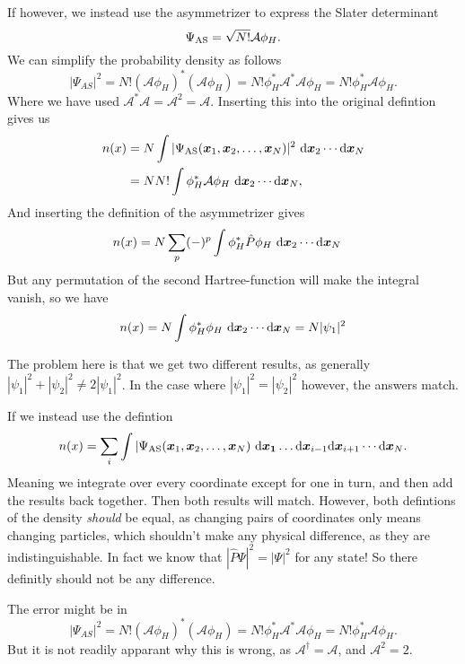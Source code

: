 \documentclass[a4paper, 11pt, notitlepage, english]{article}
\newcommand{\op}[1]{\hat{#1}}
\renewcommand{\d}{{\rm d}}
\newcommand{\bt}[1]{\boldsymbol{#1}}
\begin{document}
If however, we instead use the asymmetrizer to express the Slater determinant
$$\Psi_{\rm AS} = \sqrt{N!}\mathcal{A}\phi_H.$$
We can simplify the probability density as follows
$$|\Psi_{AS}|^2 = N! (\mathcal{A}\phi_H)^*(\mathcal{A}\phi_H) = N! \phi_H^* \mathcal{A}^*\mathcal{A} \phi_H = N! \phi^*_H \mathcal{A} \phi_H.$$
Where we have used $\mathcal{A}^*\mathcal{A} = \mathcal{A}^2 = \mathcal{A}.$ Inserting this into the original defintion gives us
\begin{align*}
n(x) &= N\int |\Psi_{\rm AS}(\bt{x}_1, \bt{x}_2, \ldots, \bt{x}_N) |^2\ \d \bt{x}_2 \cdots \d \bt{x}_N \\
&= N N! \int \phi^*_H \mathcal{A} \phi_H \ \d \bt{x}_2 \cdots \d \bt{x}_N,
\end{align*}
And inserting the definition of the asymmetrizer gives
\begin{align*}
n(x) &= N \sum_p (-)^p \int \phi^*_H \op{P} \phi_H \ \d \bt{x}_2 \cdots \d \bt{x}_N
\end{align*}
But any permutation of the second Hartree-function will make the integral vanish, so we have
$$n(x) = N \int \phi^*_H \phi_H \ \d \bt{x}_2 \cdots \d \bt{x}_N \\ = N |\psi_1|^2$$

The problem here is that we get two different results, as generally $|\psi_1|^2 + |\psi_2|^2 \neq 2 |\psi_1|^2$. In the case where $|\psi_1|^2 = |\psi_2|^2$ however, the answers match.

If we instead use the defintion 
$$n(x) = \sum_i \int |\Psi_{\rm AS}(\bt{x}_1, \bt{x}_2, \ldots, \bt{x}_N) \ \d \bt{x_1}\ldots \d \bt{x}_{i-1} \d \bt{x}_{i+1}\cdots \d \bt{x}_N.$$
Meaning we integrate over every coordinate except for one in turn, and then add the results back together. Then both results will match. However, both defintions of the density \emph{should} be equal, as changing pairs of coordinates only means changing particles, which shouldn't make any physical difference, as they are indistinguishable. In fact we know that $|\op{P}\Psi|^2 = |\Psi|^2$ for any state! So there definitly should not be any difference.

The error might be in 
$$|\Psi_{AS}|^2 = N! (\mathcal{A}\phi_H)^*(\mathcal{A}\phi_H) = N! \phi_H^* \mathcal{A}^*\mathcal{A} \phi_H = N! \phi^*_H \mathcal{A} \phi_H.$$
But it is not readily apparant why this is wrong, as $\mathcal{A}^\dag = \mathcal{A}$, and $\mathcal{A}^2 = 2$.
\end{document}
